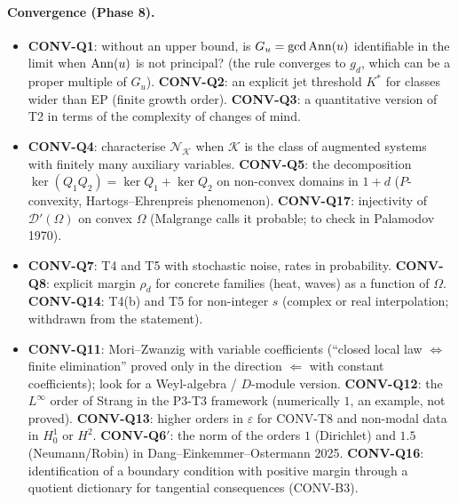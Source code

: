 \paragraph{Convergence (Phase 8).}
\begin{itemize}
\item \textbf{CONV-Q1}: without an upper bound, is $G_u=\gcd\operatorname{Ann}(u)$ identifiable in the limit when $\operatorname{Ann}(u)$ is not principal? (the rule converges to $g_d$, which can be a proper multiple of $G_u$). \textbf{CONV-Q2}: an explicit jet threshold $K^*$ for classes wider than EP (finite growth order). \textbf{CONV-Q3}: a quantitative version of T2 in terms of the complexity of changes of mind.
\item \textbf{CONV-Q4}: characterise $\mathcal N_{\mathcal K}$ when $\mathcal K$ is the class of augmented systems with finitely many auxiliary variables. \textbf{CONV-Q5}: the decomposition $\ker(Q_1Q_2)=\ker Q_1+\ker Q_2$ on non-convex domains in $1+d$ ($P$-convexity, Hartogs--Ehrenpreis phenomenon). \textbf{CONV-Q17}: injectivity of $\mathcal D'(\Omega)$ on convex $\Omega$ (Malgrange calls it probable; to check in Palamodov 1970).
\item \textbf{CONV-Q7}: T4 and T5 with stochastic noise, rates in probability. \textbf{CONV-Q8}: explicit margin $\rho_d$ for concrete families (heat, waves) as a function of $\Omega$. \textbf{CONV-Q14}: T4(b) and T5 for non-integer $s$ (complex or real interpolation; withdrawn from the statement).
\item \textbf{CONV-Q11}: Mori--Zwanzig with variable coefficients (``closed local law $\iff$ finite elimination'' proved only in the direction $\Leftarrow$ with constant coefficients); look for a Weyl-algebra / $D$-module version. \textbf{CONV-Q12}: the $L^\infty$ order of Strang in the P3-T3 framework (numerically $1$, an example, not proved). \textbf{CONV-Q13}: higher orders in $\varepsilon$ for CONV-T8 and non-modal data in $H^1_0$ or $H^2$. \textbf{CONV-Q6$'$}: the norm of the orders $1$ (Dirichlet) and $1.5$ (Neumann/Robin) in Dang--Einkemmer--Ostermann 2025. \textbf{CONV-Q16}: identification of a boundary condition with positive margin through a quotient dictionary for tangential consequences (CONV-B3).
\end{itemize}

